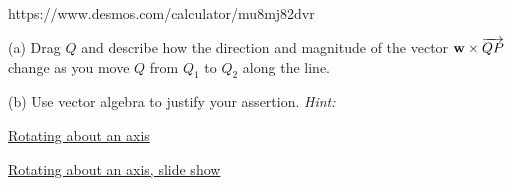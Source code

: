 \documentclass{ximera}
\begin{document}
https://www.desmos.com/calculator/mu8mj82dvr


\begin{question}  \label{Qdstjigvgf:Cross}
(a) Drag $Q$ and describe how the direction and magnitude of the vector ${\bf w}\times {\overrightarrow{QP}}$ change as you move $Q$ from $Q_1$ to $Q_2$ along the line.

(b) Use vector algebra to justify your assertion.  {\it Hint:}

 
\begin{onlineOnly}
    \begin{center}
\end{center}
\end{onlineOnly}



\end{question}



\begin{exploration}



\href{https://www.desmos.com/3d/31f1fd3ffd}{Rotating about an axis}


\href{https://www.desmos.com/3d/a82ef238da}{Rotating about an axis, slide show}


\end{exploration}
\end{document}

